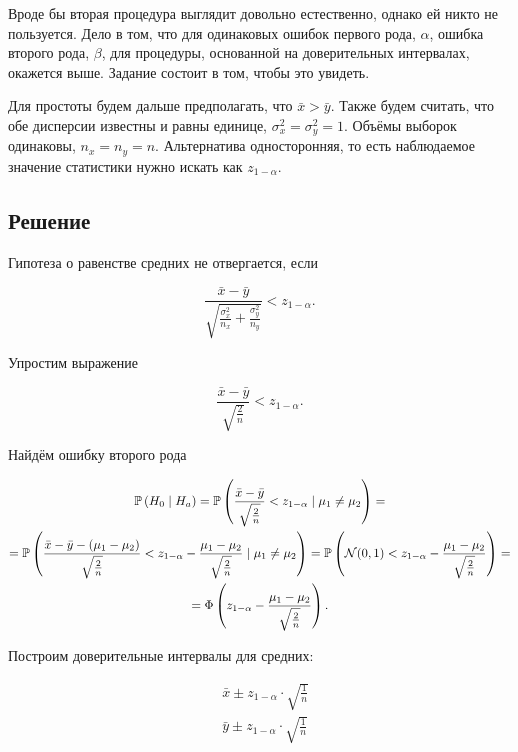 \documentclass[12pt, a4paper, oneside]{article}
\begin{document}
Вроде бы вторая процедура выглядит довольно естественно, однако ей никто не пользуется. Дело в том, что для одинаковых ошибок первого рода, $\alpha$, ошибка второго рода, $\beta$, для процедуры, основанной на доверительных интервалах, окажется выше. Задание состоит в том, чтобы это увидеть.

Для простоты будем дальше предполагать, что $\bar x > \bar y$. Также будем считать, что обе дисперсии известны и равны единице, $\sigma^2_x = \sigma^2_y = 1$. Объёмы выборок одинаковы, $n_x = n_y = n$. Альтернатива односторонняя, то есть наблюдаемое значение статистики нужно искать как $z_{1 - \alpha}$. 


\subsection*{Решение}

Гипотеза о равенстве средних не отвергается, если

$$
\frac{\bar{x} - \bar{y}}{\sqrt{\frac{\sigma^2_x}{n_x} + \frac{\sigma^2_y}{n_y}}} < z_{1-\alpha}.
$$

Упростим выражение

$$
\frac{\bar{x} - \bar{y}}{\sqrt{\frac{2}{n}}} < z_{1-\alpha}.
$$

Найдём ошибку второго рода

\begin{multline*}
\mathbb{P} \left( H_0 \mid H_a \right) = \mathbb{P} \left( \frac{\bar{x} - \bar{y}}{\sqrt{\frac{2}{n}}} < z_{1-\alpha} \mid \mu_1 \ne \mu_2 \right)  = \\ = \mathbb{P} \left( \frac{\bar{x} - \bar{y} - (\mu_1 - \mu_2)}{\sqrt{\frac{2}{n}}} < z_{1-\alpha} - \frac{\mu_1 - \mu_2}{\sqrt{\frac{2}{n}}} \mid \mu_1 \ne \mu_2 \right) = \mathbb{P} \left( \mathcal{N}(0,1) < z_{1-\alpha} - \frac{\mu_1 - \mu_2}{\sqrt{\frac{2}{n}}} \right) = \\ = \Phi \left( z_{1-\alpha} - \frac{\mu_1 - \mu_2}{\sqrt{\frac{2}{n}}} \right).
\end{multline*}




Построим доверительные интервалы для средних:

$$
\begin{aligned} 
& \bar{x} \pm z_{1 - \alpha} \cdot \sqrt{ \frac{1}{n} } \\
& \bar{y} \pm z_{1 - \alpha} \cdot \sqrt{ \frac{1}{n} }
\end{aligned} 
$$
\end{document}
